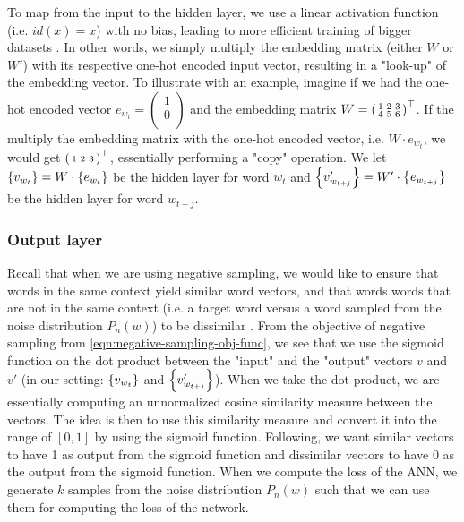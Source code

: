 To map from the input to the hidden layer, we use a linear activation function (i.e. $id(x) = x$) with no bias, leading to more efficient training of bigger datasets \cite{mikolov2013a}. In other words, we simply multiply the embedding matrix (either $W$ or $W'$) with its respective one-hot encoded input vector, resulting in a "look-up" of the embedding vector. To illustrate with an example, imagine if we had the one-hot encoded vector $e_{w_t} = \left( \begin{smallmatrix}
    1\\
    0\\
\end{smallmatrix} \right)$ and the embedding matrix $W = {\left( \begin{smallmatrix}
    1 & 2 & 3\\
    4 & 5 & 6\\
\end{smallmatrix} \right)}^\top$. If the multiply the embedding matrix with the one-hot encoded vector, i.e. $W \cdot e_{w_t}$, we would get ${\left( \begin{smallmatrix}
    1 & 2 & 3\\
\end{smallmatrix} \right)}^\top$, essentially performing a "copy" operation. We let $\left\{v_{w_t}\right\} = W \cdot \left\{e_{w_t}\right\}$ be the hidden layer for word $w_t$ and $\left\{v'_{w_{t+j}}\right\} = W' \cdot \left\{e_{w_{t+j}}\right\}$ be the hidden layer for word $w_{t+j}$. 

\subsubsection{Output layer}
Recall that when we are using negative sampling, we would like to ensure that words in the same context yield similar word vectors, and that words words that are not in the same context (i.e. a target word versus a word sampled from the noise distribution $P_n(w)$) to be dissimilar \cite{mikolov2013b}. From the objective of negative sampling from \cref{eqn:negative-sampling-obj-func}, we see that we use the sigmoid function on the dot product between the "input" and the "output" vectors $v$ and $v'$ (in our setting: $\left\{v_{w_t}\right\}$ and $\left\{v'_{w_{t+j}}\right\}$). When we take the dot product, we are essentially computing an unnormalized cosine similarity measure between the vectors. The idea is then to use this similarity measure and convert it into the range of $[0, 1]$ by using the sigmoid function. Following, we want similar vectors to have 1 as output from the sigmoid function and dissimilar vectors to have 0 as the output from the sigmoid function. When we compute the loss of the ANN, we generate $k$ samples from the noise distribution $P_n(w)$ such that we can use them for computing the loss of the network.

